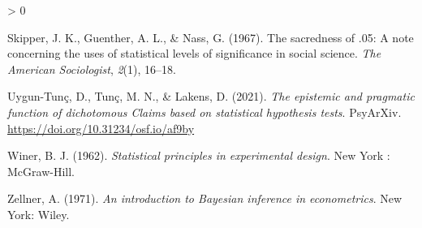 \documentclass[
  english,
  ,man, a4paper,floatsintext]{apa6}
\newlength{\cslhangindent}
\newenvironment{CSLReferences}[2] %
 {%
  \setlength{\parindent}{0pt}
  \ifodd #1 \everypar{\setlength{\hangindent}{\cslhangindent}}\ignorespaces\fi
  \ifnum #2 > 0
  \setlength{\parskip}{#2\baselineskip}
  \fi
 }%
 {}
\begin{document}
\begin{CSLReferences}{1}{0}
\leavevmode\hypertarget{ref-skipper_sacredness_1967}{}%
Skipper, J. K., Guenther, A. L., \& Nass, G. (1967). The sacredness of .05: A note concerning the uses of statistical levels of significance in social science. \emph{The American Sociologist}, \emph{2}(1), 16--18.

\leavevmode\hypertarget{ref-tunc_epistemic_2021}{}%
Uygun-Tunç, D., Tunç, M. N., \& Lakens, D. (2021). \emph{The epistemic and pragmatic function of dichotomous {Claims} based on statistical hypothesis tests}. PsyArXiv. \url{https://doi.org/10.31234/osf.io/af9by}

\leavevmode\hypertarget{ref-winer_statistical_1962}{}%
Winer, B. J. (1962). \emph{Statistical principles in experimental design}. {New York : McGraw-Hill}.

\leavevmode\hypertarget{ref-zellner_introduction_1971}{}%
Zellner, A. (1971). \emph{An introduction to {Bayesian} inference in econometrics}. {New York}: {Wiley}.

\end{CSLReferences}

\endgroup
\end{document}
